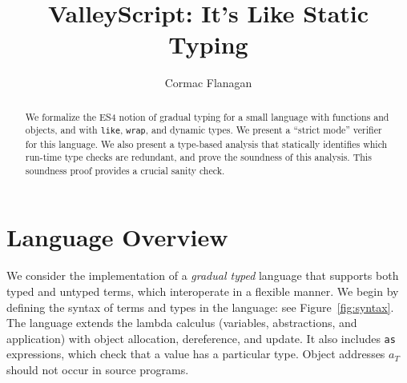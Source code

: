 \documentclass{article}
\newcommand{\myclearpage}{}
\renewcommand{\myclearpage}{\clearpage}
\newcommand{\comment}[1]{}
\newcommand{\Int}{\t{Int}}
\newcommand{\Bool}{\t{Bool}}
\renewcommand{\t}[1]{{\tt #1}}
\begin{document}
\title{ValleyScript: It's Like Static Typing
}
\author{Cormac Flanagan}


\maketitle

\begin{abstract}
We formalize the ES4 notion of gradual typing for a small language with functions and objects, and with \t{like}, \t{wrap}, and dynamic types.
We present a ``strict mode'' verifier for this language.
We also present a type-based analysis that statically identifies which run-time type checks are redundant, 
and prove the soundness of this analysis. 
This soundness proof provides a crucial sanity check.
\end{abstract}

\comment{
\section{Change Log}
\begin{itemize}
\item
6 Oct: extended with generic function, as a warm-up for implementing all this in the verifier.
\item
8 Nov: extended with conversion from $\Int$ to $\Bool$.
\item
14 Nov: extended with generic functions.
\item
14 Nov: added wrap as a type constructor.
\item 
20 Nov: rework based on allocated and current types
\item
26 Nov: rework with two subtype relations
\item
27 Nov: rework with ideas from Siek+Taha
\item
todo: check proofs for like, wrap, and int to bool conversions
\item
todo: added typedefs and generics
\item
todo: resolve contravariant subtyping on function domains
\end{itemize}
}
\myclearpage
\section{Language Overview}

We consider the implementation of a \emph{gradual typed} language that supports both
typed and untyped terms, which interoperate in a flexible manner.
We begin by defining the syntax of terms and types in the language: see Figure~\ref{fig:syntax}.
The language extends  the lambda calculus (variables, abstractions, and application)
with object allocation, dereference, and update. 
It also includes \t{as} expressions, which check that a value has a particular type.
Object addresses $a_T$ should not occur in source programs.
\end{document}

